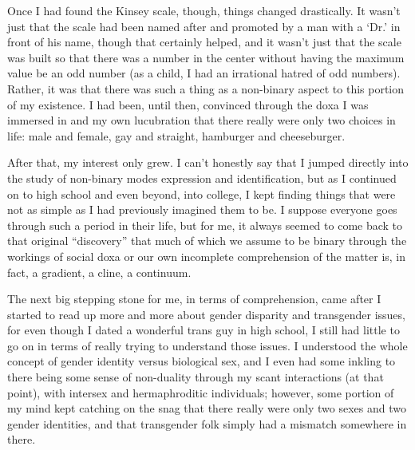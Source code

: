 Once I had found the Kinsey scale, though, things changed drastically.  It wasn't just that the scale had been named after and promoted by a man with a ‘Dr.' in front of his name, though that certainly helped, and it wasn't just that the scale was built so that there was a number in the center without having the maximum value be an odd number (as a child, I had an irrational hatred of odd numbers).  Rather, it was that there was such a thing as a non-binary aspect to this portion of my existence.  I had been, until then, convinced through the doxa I was immersed in and my own lucubration that there really were only two choices in life: male and female, gay and straight, hamburger and cheeseburger.

After that, my interest only grew.  I can't honestly say that I jumped directly into the study of non-binary modes expression and identification, but as I continued on to high school and even beyond, into college, I kept finding things that were not as simple as I had previously imagined them to be.  I suppose everyone goes through such a period in their life, but for me, it always seemed to come back to that original ``discovery'' that much of which we assume to be binary through the workings of social doxa or our own incomplete comprehension of the matter is, in fact, a gradient, a cline, a continuum.

The next big stepping stone for me, in terms of comprehension, came after I started to read up more and more about gender disparity and transgender issues, for even though I dated a wonderful trans guy in high school, I still had little to go on in terms of really trying to understand those issues.  I understood the whole concept of gender identity versus biological sex, and I even had some inkling to there being some sense of non-duality through my scant interactions (at that point), with intersex and hermaphroditic individuals; however, some portion of my mind kept catching on the snag that there really were only two sexes and two gender identities, and that transgender folk simply had a mismatch somewhere in there.

